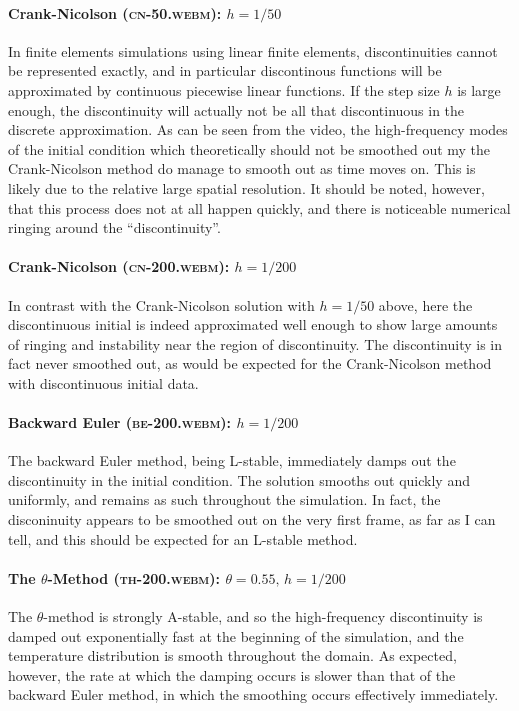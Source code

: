 \begin{solution}
\paragraph*{Crank-Nicolson (\textsc{cn-50.webm}): $h=1/50$}
In finite elements simulations using linear finite elements, discontinuities cannot be represented exactly, and in particular discontinous functions will be approximated by continuous piecewise linear functions.
If the step size $h$ is large enough, the discontinuity will actually not be all that discontinuous in the discrete approximation.
As can be seen from the video, the high-frequency modes of the initial condition which theoretically should not be smoothed out my the Crank-Nicolson method do manage to smooth out as time moves on.
This is likely due to the relative large spatial resolution.
It should be noted, however, that this process does not at all happen quickly, and there is noticeable numerical ringing around the ``discontinuity''.

\paragraph*{Crank-Nicolson (\textsc{cn-200.webm}): $h=1/200$}
In contrast with the Crank-Nicolson solution with $h=1/50$ above, here the discontinuous initial is indeed approximated well enough to show large amounts of ringing and instability near the region of discontinuity.
The discontinuity is in fact never smoothed out, as would be expected for the Crank-Nicolson method with discontinuous initial data.

\paragraph*{Backward Euler (\textsc{be-200.webm}): $h=1/200$}
The backward Euler method, being L-stable, immediately damps out the discontinuity in the initial condition.
The solution smooths out quickly and uniformly, and remains as such throughout the simulation.
In fact, the disconinuity appears to be smoothed out on the very first frame, as far as I can tell, and this should be expected for an L-stable method.

\paragraph*{The $\theta$-Method (\textsc{th-200.webm}): $\theta = 0.55,\,h=1/200$}
The $\theta$-method is strongly A-stable, and so the high-frequency discontinuity is damped out exponentially fast at the beginning of the simulation, and the temperature distribution is smooth throughout the domain.
As expected, however, the rate at which the damping occurs is slower than that of the backward Euler method, in which the smoothing occurs effectively immediately.


\end{solution}

